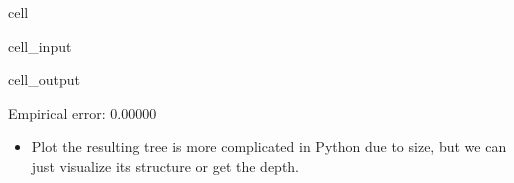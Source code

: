 \documentclass[letterpaper,10pt,english]{jupyterBook}
\begin{document}
\begin{sphinxuseclass}{cell}\begin{sphinxVerbatimInput}

\begin{sphinxuseclass}{cell_input}
\begin{sphinxVerbatim}[commandchars=\\\{\}]
 

  
 
  

   
\end{sphinxVerbatim}

\end{sphinxuseclass}\end{sphinxVerbatimInput}
\begin{sphinxVerbatimOutput}

\begin{sphinxuseclass}{cell_output}
\begin{sphinxVerbatim}[commandchars=\\\{\}]
Empirical error: 0.00000
\end{sphinxVerbatim}

\end{sphinxuseclass}\end{sphinxVerbatimOutput}

\end{sphinxuseclass}\begin{itemize}
\item {} 
\sphinxAtStartPar
Plot the resulting tree is more complicated in Python due to size, but we can just visualize its structure or get the depth.

\end{itemize}
\end{document}
